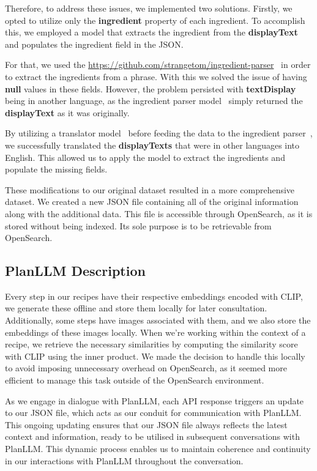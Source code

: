 \documentclass[runningheads]{llncs}
\begin{document}
Therefore, to address these issues, we implemented two solutions. Firstly, we opted to utilize only the \textbf{ingredient} property of each ingredient. To accomplish this, we employed a model that extracts the ingredient from the \textbf{displayText} and populates the ingredient field in the JSON.

For that, we used the \url{https://github.com/strangetom/ingredient-parser}~\cite{ingredientParser} in order to extract the ingredients from a phrase. With this we solved the issue of having \textbf{null} values in these fields. However, the problem persisted with \textbf{textDisplay} being in another language, as the ingredient parser model~\cite{ingredientParser} simply returned the \textbf{displayText} as it was originally.

By utilizing a translator model~\cite{deeptranslate} before feeding the data to the ingredient parser~\cite{ingredientParser}, we successfully translated the \textbf{displayTexts} that were in other languages into English. This allowed us to apply the model to extract the ingredients and populate the missing fields.

These modifications to our original dataset resulted in a more comprehensive dataset. We created a new JSON file containing all of the original information along with the additional data. This file is accessible through OpenSearch, as it is stored without being indexed. Its sole purpose is to be retrievable from OpenSearch.

\subsection{PlanLLM Description}
Every step in our recipes have their respective embeddings encoded with CLIP, we generate these offline and store them locally for later consultation. Additionally, some steps have images associated with them, and we also store the embeddings of these images locally. When we're working within the context of a recipe, we retrieve the necessary similarities by computing the similarity score with CLIP using the inner product. We made the decision to handle this locally to avoid imposing unnecessary overhead on OpenSearch, as it seemed more efficient to manage this task outside of the OpenSearch environment.

As we engage in dialogue with PlanLLM, each API response triggers an update to our JSON file, which acts as our conduit for communication with PlanLLM. This ongoing updating ensures that our JSON file always reflects the latest context and information, ready to be utilised in subsequent conversations with PlanLLM. This dynamic process enables us to maintain coherence and continuity in our interactions with PlanLLM throughout the conversation.


\end{document}

